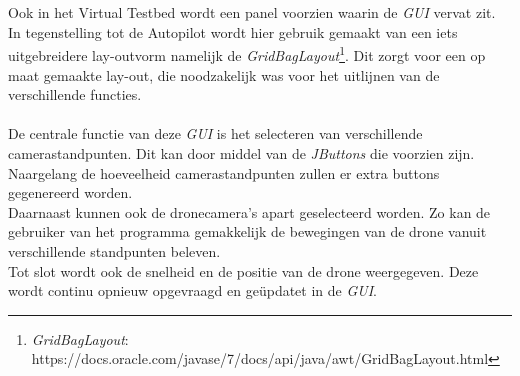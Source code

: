 \\
\\
Ook in het Virtual Testbed wordt een panel voorzien waarin de \textit{GUI} vervat zit. In tegenstelling tot de Autopilot wordt hier gebruik gemaakt van een iets uitgebreidere lay-outvorm namelijk de \textit{GridBagLayout}\footnote{\textit{GridBagLayout}: https://docs.oracle.com/javase/7/docs/api/java/awt/GridBagLayout.html}. Dit zorgt voor een op maat gemaakte lay-out, die noodzakelijk was voor het uitlijnen van de verschillende functies. 
\\
\\
De centrale functie van deze \textit{GUI} is het selecteren van verschillende camerastandpunten. Dit kan door middel van de \textit{JButtons} die voorzien zijn. Naargelang de hoeveelheid camerastandpunten zullen er extra buttons gegenereerd worden.
\\
Daarnaast kunnen ook de dronecamera's apart geselecteerd worden. Zo kan de gebruiker van het programma gemakkelijk de bewegingen van de drone vanuit verschillende standpunten beleven.  
\\
Tot slot wordt ook de snelheid en de positie van de drone weergegeven. Deze wordt continu opnieuw opgevraagd en ge\"{u}pdatet in de \textit{GUI}. 